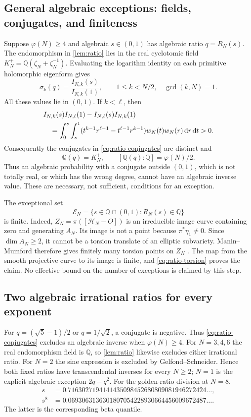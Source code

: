 \documentclass[11pt,a4paper]{article}
\numberwithin{equation}{section}
\theoremstyle{definition}
\theoremstyle{remark}
\newcommand{\Q}{\mathbb Q}
\newcommand{\Qb}{\overline{\mathbb Q}}
\newcommand{\dd}{\,\mathrm d}
\begin{document}
\subsection{General algebraic exceptions: fields, conjugates, and finiteness}
Suppose $\varphi(N)\ge4$ and algebraic $s\in(0,1)$ has algebraic ratio
$q=R_N(s)$. The endomorphism in \cref{lem:ratio} lies in the real cyclotomic
field $K_N^+=\Q(\zeta_N+\zeta_N^{-1})$. Evaluating the logarithm identity
on each primitive holomorphic eigenform gives
\begin{equation}\label{eq:ratio-conjugates}
 \sigma_k(q)=\frac{I_{N,k}(s)}{I_{N,k}(1)},\qquad
 1\le k<N/2,\quad\gcd(k,N)=1.
\end{equation}
All these values lie in $(0,1)$. If $k<\ell$, then
\begin{align}
 &I_{N,k}(s)I_{N,\ell}(1)-I_{N,\ell}(s)I_{N,k}(1)\notag\\
 &\quad=\int_0^s\int_s^1
 (t^{k-1}r^{\ell-1}-t^{\ell-1}r^{k-1})w_N(t)w_N(r)\dd r\dd t>0.
\end{align}
Consequently the conjugates in \eqref{eq:ratio-conjugates} are distinct and
\begin{equation}\label{eq:ratio-degree}
 \Q(q)=K_N^+,\qquad [\Q(q):\Q]=\varphi(N)/2.
\end{equation}
Thus an algebraic probability with a conjugate outside $(0,1)$, which is
not totally real, or which has the wrong degree, cannot have an algebraic
inverse value. These are necessary, not sufficient, conditions for an
exception.

The exceptional set
\[
 \mathcal E_N=\{s\in\Qb\cap(0,1):R_N(s)\in\Qb\}
\]
is finite. Indeed, $Z_N=\pi([\mathcal H_N-O])$ is an irreducible image curve
containing zero and generating $A_N$. Its image is not a point because
$\pi^*\eta_1\ne0$. Since $\dim A_N\ge2$, it cannot be a torsion translate
of an elliptic subvariety. Manin--Mumford therefore gives finitely many
torsion points on $Z_N$ \cite{Roessler}. The map from the smooth projective
curve to its image is finite, and \eqref{eq:ratio-torsion} proves the claim.
No effective bound on the number of exceptions is claimed by this step.

\subsection{Two algebraic irrational ratios for every exponent}
For $q=(\sqrt5-1)/2$ or $q=1/\sqrt2$, a conjugate is negative. Thus
\eqref{eq:ratio-conjugates} excludes an algebraic inverse when
$\varphi(N)\ge4$. For $N=3,4,6$ the real endomorphism field is $\Q$, so
\cref{lem:ratio} likewise excludes either irrational ratio. For $N=2$ the
sine expression is excluded by Gelfond--Schneider. Hence both fixed ratios
have transcendental inverses for every $N\ge2$; $N=1$ is the explicit
algebraic exception $2q-q^2$.
For the golden-ratio division at $N=8$,
\begin{align*}
 s&=0.7163027194141435098452680809081946272424\ldots,\\
 s^8&=0.0693063136301807054228930664456009672487\ldots.
\end{align*}
The latter is the corresponding beta quantile.
\end{document}
